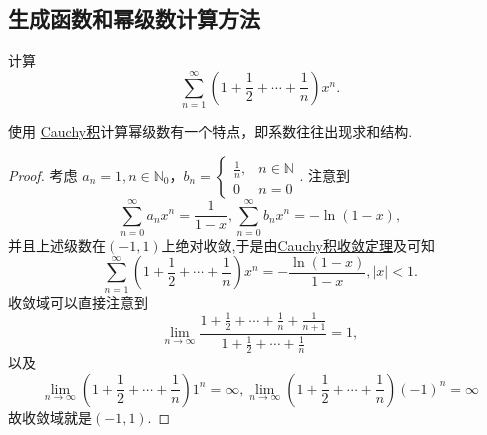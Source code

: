 \documentclass[../../main.tex]{subfiles}%
\begin{document}
\subsection{生成函数和幂级数计算方法}

\begin{example}\label{example:例题11.24556415}
计算
\[
\sum_{n=1}^{\infty} \left(1 + \frac{1}{2} + \cdots + \frac{1}{n}\right) x^n.
\]
\end{example}
\begin{note}
使用 \hyperref[definition:Cauchy积]{Cauchy积}计算幂级数有一个特点，即系数往往出现求和结构.
\end{note}
\begin{proof}
考虑 \(a_n = 1, n \in \mathbb{N}_0\)，\(b_n = \begin{cases} \frac{1}{n}, & n \in \mathbb{N} \\ 0 & n = 0 \end{cases}\). 注意到
\[
\sum_{n=0}^{\infty} a_n x^n = \frac{1}{1 - x}, \sum_{n=0}^{\infty} b_n x^n = -\ln (1 - x),
\]
并且上述级数在$(-1,1)$上绝对收敛,于是由\hyperref[theorem:Cauchy积收敛定理]{Cauchy积收敛定理}及可知
\[
\sum_{n=1}^{\infty} \left(1 + \frac{1}{2} + \cdots + \frac{1}{n}\right) x^n = -\frac{\ln (1 - x)}{1 - x}, |x| < 1.
\]
收敛域可以直接注意到
\[
\lim_{n \to \infty} \frac{1 + \frac{1}{2} + \cdots + \frac{1}{n} + \frac{1}{n + 1}}{1 + \frac{1}{2} + \cdots + \frac{1}{n}} = 1,
\]
以及
\[
\lim_{n \to \infty} \left(1 + \frac{1}{2} + \cdots + \frac{1}{n}\right) 1^n = \infty, \lim_{n \to \infty} \left(1 + \frac{1}{2} + \cdots + \frac{1}{n}\right) (-1)^n = \infty
\]
故收敛域就是$(-1,1)$.
\end{proof}
\end{document}
